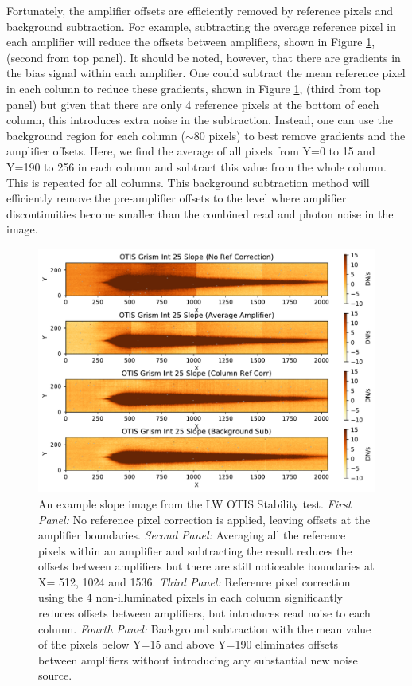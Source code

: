 \documentclass{aastex62}
\begin{document}
Fortunately, the amplifier offsets are efficiently removed by reference pixels and background subtraction.
For example, subtracting the average reference pixel in each amplifier will reduce the offsets between amplifiers, shown in Figure \ref{fig:ampOffsetsOtisGrismSlope}, (second from top panel).
It should be noted, however, that there are gradients in the bias signal within each amplifier.
One could subtract the mean reference pixel in each column to reduce these gradients, shown in Figure \ref{fig:ampOffsetsOtisGrismSlope}, (third from top panel) but given that there are only 4 reference pixels at the bottom of each column, this introduces extra noise in the subtraction.
Instead, one can use the background region for each column ($\sim$80 pixels) to best remove gradients and the amplifier offsets.
Here, we find the average of all pixels from Y=0 to 15 and Y=190 to 256 in each column and subtract this value from the whole column.
This is repeated for all columns.
This background subtraction method will efficiently remove the pre-amplifier offsets to the level where amplifier discontinuities become smaller than the combined read and photon noise in the image.

\begin{figure}[!hbtp]
\centering
\includegraphics[width=.79\columnwidth]{amplifier_offsets_in_otis_lw_grism.pdf}
\caption{An example slope image from the LW OTIS Stability test.
{\it First Panel:} No reference pixel correction is applied, leaving offsets at the amplifier boundaries.
{\it Second Panel:} Averaging all the reference pixels within an amplifier and subtracting the result reduces the offsets between amplifiers but there are still noticeable boundaries at X= 512, 1024 and 1536.
{\it Third Panel:} Reference pixel correction using the 4 non-illuminated pixels in each column significantly reduces offsets between amplifiers, but introduces read noise to each column.
{\it Fourth Panel:} Background subtraction with the mean value of the pixels below Y=15 and above Y=190 eliminates offsets between amplifiers without introducing any substantial new noise source.
}\label{fig:ampOffsetsOtisGrismSlope}
\end{figure}
\end{document}
